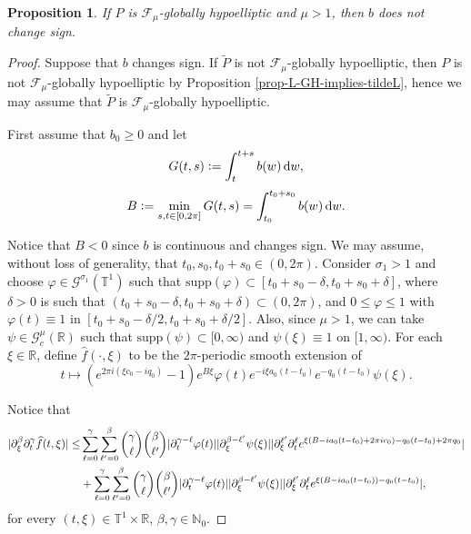 \documentclass[11pt,reqno]{amsart}
\numberwithin{equation}{section}
\newtheorem{prop}[theorem]{Proposition}
\theoremstyle{definition}
\theoremstyle{definition}
\newcommand{\supp}{\text{supp}}
\newcommand{\T}{\mathbb{T}}
\newcommand{\R}{\mathbb{R}}
\newcommand{\N}{\mathbb{N}}
\newcommand{\defeq}{\vcentcolon=}
\begin{document}
\begin{prop}
     If $P$ is $\mathscr{F}_{\mu}$-globally hypoelliptic and $\mu>1$, then $b$ does not change sign.
\end{prop}
\begin{proof}
    Suppose that $b$ changes sign. If $\tilde{P}$ is not $\mathscr{F}_{\mu}$-globally hypoelliptic, then $P$ is  not $\mathscr{F}_{\mu}$-globally hypoelliptic by Proposition \ref{prop-L-GH-implies-tildeL}, hence we may assume that $\tilde{P}$ is $\mathscr{F}_{\mu}$-globally hypoelliptic.
    
    First assume that $b_0\geq 0$ and let
    \begin{equation*}
    G(t,s) \defeq\int_t^{t+s}b(w)\,\mathrm{d}w,
    \end{equation*}
    \begin{equation*}
        B\defeq \min_{s,t\in[0,2\pi]}G(t,s)=\int_{t_0}^{t_0+s_0}b(w)\,\mathrm{d}w.
    \end{equation*}
    
    Notice that $B<0$ since $b$ is continuous and changes sign. We may assume, without loss of generality, that $t_0,s_0,t_0+s_0\in(0,2\pi)$. Consider $\sigma_1>1$ and choose $\varphi\in \mathscr{G}^{\sigma_1}(\T^1)$ such that $\supp(\varphi)\subset[t_0+s_0-\delta,t_0+s_0+\delta]$, where $\delta>0$ is such that $(t_0+s_0-\delta ,t_0+s_0+\delta)\subset(0,2\pi)$, and $0\leq \varphi\leq 1$ with $\varphi(t)\equiv1$ in $[t_0+s_0-\delta/2,t_0+s_0+\delta/2]$. 
    Also, since $\mu>1$, we can take $\psi\in \mathscr{G}^\mu_c(\R)$ such that $\supp(\psi)\subset[0,\infty)$ and $\psi(\xi)\equiv1 $ on $[1,\infty)$. For each $\xi\in\R$, define $\widehat{f}(\cdot,\xi)$ to be the $2\pi$-periodic smooth extension of
    \[t\mapsto (e^{2\pi i(\xi c_0-iq_0)}-1)e^{B\xi}\varphi(t)e^{-i\xi a_0(t-t_0)}e^{-q_0(t-t_0)}\psi(\xi).\]
    
    Notice that
\begin{align}
|\partial_\xi^\beta\partial_t^\gamma\widehat{f}(t,\xi)|\leq & \sum_{\ell=0}^\gamma\sum_{\ell'=0}^\beta  \binom{\gamma}{\ell}\binom{\beta}{\ell'}|\partial_t^{\gamma-\ell}\varphi(t)||\partial_\xi^{\beta-\ell'}\psi(\xi)||\partial_\xi^{\ell'}\partial_t^{\ell}e^{\xi(B-ia_0(t-t_0)+2\pi i c_0)-q_0(t-t_0)+2\pi q_0}|\notag\\
    & +\sum_{\ell=0}^\gamma\sum_{\ell'=0}^\beta \binom{\gamma}{\ell}\binom{\beta}{\ell'} |\partial_t^{\gamma-\ell}\varphi(t)||\partial_\xi^{\beta-\ell'}\psi(\xi)||\partial_\xi^{\ell'}\partial_t^{\ell}e^{\xi(B-ia_0(t-t_0))-q_0(t-t_0)}|\label{ineq_fourer_changes_sign},
\end{align}
    for every $(t,\xi)\in\T^1\times\R$, $\beta,\gamma\in\N_0$.
    

\end{proof}
\end{document}
